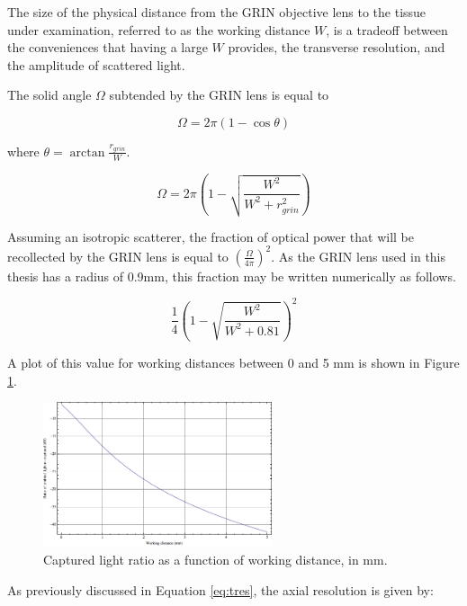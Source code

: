 The size of the physical distance from the GRIN objective lens to the tissue under examination, referred to as the working distance $W$, is a tradeoff between the conveniences that having a large $W$ provides, the  transverse resolution, and the amplitude of scattered light.


The solid angle $\Omega$ subtended by the GRIN lens is equal to

\begin{equation}
\Omega = 2 \pi (1 - \cos{\theta})
\end{equation}

where $\theta = \arctan{\frac{r_{grin}}{W}}$.

\begin{equation}
\Omega = 2 \pi \left(1 - \sqrt{\frac{W^2}{W^2 + r_{grin}^2}} \right)
\end{equation}

Assuming an isotropic scatterer, the fraction of optical power that will be recollected by the GRIN lens is equal to $ \left( \frac{\Omega}{4 \pi} \right)^2 $. As the GRIN lens used in this thesis has a radius of 0.9mm, this fraction may be written numerically as follows.

\begin{equation}
\frac{1}{4} \left( 1 - \sqrt{\frac{W^2}{W^2 + 0.81}} \right) ^ 2
\end{equation}

A plot of this value for working distances between 0 and 5 mm is shown in Figure \ref{fig:wd}.

\begin{figure}[h!]
\centering
\includegraphics[width=0.6\textwidth]{Images/System/grin_scattering.png}
\caption{Captured light ratio as a function of working distance, in mm. \label{fig:wd}}
\end{figure}

As previously discussed in Equation \ref{eq:tres}, the axial resolution is given by:


